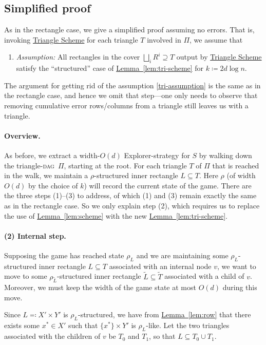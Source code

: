 \documentclass[11pt]{article}
\numberwithin{equation}{section}
\theoremstyle{definition}
\theoremstyle{plain}
\newcommand{\expref}[2]{\hyperref[#2]{#1~\ref{#2}}}
\newcommand{\rectlemma}{\expref{Lemma}{lem:scheme}\xspace}%
\newcommand{\trilemma}{\expref{Lemma}{lem:tri-scheme}\xspace}%
\newcommand{\trischeme}{\hyperref[alg:tri-partition]{Triangle Scheme}\xspace}
\newcommand{\DAG}{\textsc{dag}}
\begin{document}
\subsection{Simplified proof}\label{sec:tri-simple-proof}

As in the rectangle case, we give a simplified proof assuming no errors. That is, invoking \trischeme for each triangle $T$ involved in $\Pi$, we assume that
\begin{enumerate}[label=($\bm{\dagger}$)]
\item \label{tri-assumption}
\emph{Assumption:} All rectangles in the cover $\bigsqcup_i R^i\supseteq T$ output by \trischeme satisfy the ``structured'' case of \trilemma for $k\coloneqq 2d\log n$.
\end{enumerate}

\noindent The argument for getting rid of the assumption \ref{tri-assumption} is the same as in the rectangle case, and hence we omit that step---one only needs to observe that removing cumulative error rows/columns from a triangle still leaves us with a triangle.

\paragraph{Overview.}
As before, we extract a width-$O(d)$ Explorer-strategy for $S$ by walking down the triangle-\DAG~$\Pi$, starting at the root. For each triangle $T$ of $\Pi$ that is reached in the walk, we maintain a $\rho$-structured inner rectangle $L\subseteq T$. Here $\rho$ (of width $O(d)$ by the choice of $k$) will record the current state of the game. There are the three steps (1)--(3) to address, of which (1) and (3) remain exactly the same as in the rectangle case. So we only explain step (2), which requires us to replace the use of \rectlemma with the new \trilemma.

\paragraph{(2) Internal step.}
Supposing the game has reached state $\rho_{L}$ and we are maintaining some $\rho_{L}$-structured inner rectangle $L\subseteq T$ associated with an internal node $v$, we want to move to some $\rho_{\widetilde{L}}$-structured inner rectangle $\widetilde{L}\subseteq \widetilde{T}$ associated with a child of $v$. Moreover, we must keep the width of the game state at most $O(d)$ during this move.
 

Since $L \eqqcolon X' \times Y'$ is $\rho_L$-structured, we have from \expref{Lemma}{lem:row} that there exists some $x^* \in X'$ such that $\{ x^*\} \times Y'$ is $\rho_L$-like. Let the two triangles associated with the children of $v$ be $T_0$ and $T_1$, so that $L\subseteq T_0\cup T_1$.
\end{document}
